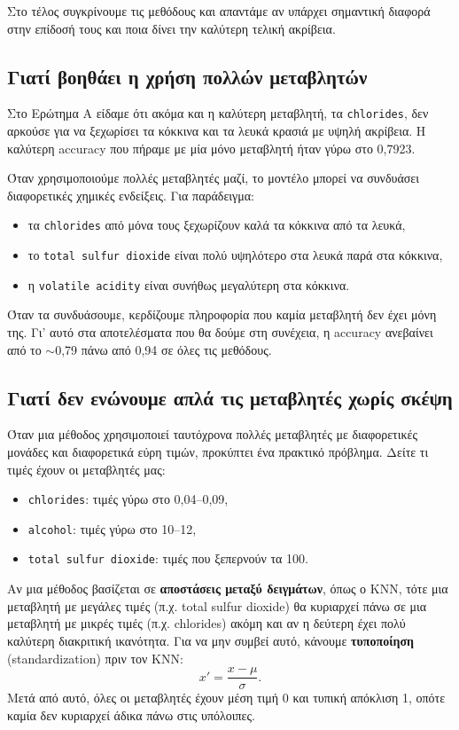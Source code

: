 \documentclass[11pt,a4paper]{article}
\newcommand{\code}[1]{\texttt{#1}}
\begin{document}
Στο τέλος συγκρίνουμε τις μεθόδους και απαντάμε αν υπάρχει σημαντική
διαφορά στην επίδοσή τους και ποια δίνει την καλύτερη τελική ακρίβεια.

\subsection{Γιατί βοηθάει η χρήση πολλών μεταβλητών}

Στο Ερώτημα Α είδαμε ότι ακόμα και η καλύτερη μεταβλητή, τα
\code{chlorides}, δεν αρκούσε για να ξεχωρίσει τα κόκκινα και τα λευκά
κρασιά με υψηλή ακρίβεια. Η καλύτερη accuracy που πήραμε με μία μόνο
μεταβλητή ήταν γύρω στο 0,7923.

Όταν χρησιμοποιούμε πολλές μεταβλητές μαζί, το μοντέλο μπορεί να
συνδυάσει διαφορετικές χημικές ενδείξεις. Για παράδειγμα:
\begin{itemize}
    \item τα \code{chlorides} από μόνα τους ξεχωρίζουν καλά τα κόκκινα από τα
    λευκά,
    \item το \code{total sulfur dioxide} είναι πολύ υψηλότερο στα λευκά παρά
    στα κόκκινα,
    \item η \code{volatile acidity} είναι συνήθως μεγαλύτερη στα κόκκινα.
\end{itemize}
Όταν τα συνδυάσουμε, κερδίζουμε πληροφορία που καμία μεταβλητή δεν έχει
μόνη της. Γι' αυτό στα αποτελέσματα που θα δούμε στη συνέχεια, η accuracy
ανεβαίνει από το $\sim$0,79 πάνω από 0,94 σε όλες τις μεθόδους.

\subsection{Γιατί δεν ενώνουμε απλά τις μεταβλητές χωρίς σκέψη}

Όταν μια μέθοδος χρησιμοποιεί ταυτόχρονα πολλές μεταβλητές με διαφορετικές
μονάδες και διαφορετικά εύρη τιμών, προκύπτει ένα πρακτικό πρόβλημα.
Δείτε τι τιμές έχουν οι μεταβλητές μας:
\begin{itemize}
    \item \code{chlorides}: τιμές γύρω στο 0,04--0,09,
    \item \code{alcohol}: τιμές γύρω στο 10--12,
    \item \code{total sulfur dioxide}: τιμές που ξεπερνούν τα 100.
\end{itemize}

Αν μια μέθοδος βασίζεται σε \textbf{αποστάσεις μεταξύ δειγμάτων}, όπως ο
KNN, τότε μια μεταβλητή με μεγάλες τιμές (π.χ. total sulfur dioxide) θα
κυριαρχεί πάνω σε μια μεταβλητή με μικρές τιμές (π.χ. chlorides) ακόμη και
αν η δεύτερη έχει πολύ καλύτερη διακριτική ικανότητα. Για να μην συμβεί
αυτό, κάνουμε \textbf{τυποποίηση} (standardization) πριν τον KNN:
\[
x' = \frac{x - \mu}{\sigma}.
\]
Μετά από αυτό, όλες οι μεταβλητές έχουν μέση τιμή 0 και τυπική απόκλιση 1,
οπότε καμία δεν κυριαρχεί άδικα πάνω στις υπόλοιπες.
\end{document}
